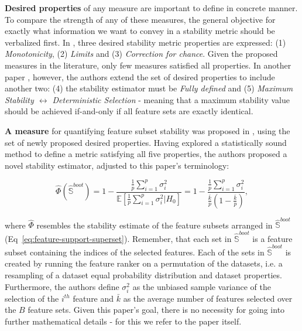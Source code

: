 \documentclass[../main.tex]{subfiles}
\begin{document}
\textbf{Desired properties} of any measure are important to define in concrete manner. To compare the strength of any of these measures, the general objective for exactly what information we want to convey in a stability metric should be verbalized first. In \citep{mohana_chelvan_survey_2016}, three desired stability metric properties are expressed: (1) \textit{Monotonicity}, (2) \textit{Limits} and (3) \textit{Correction for chance}. Given the proposed measures in the literature, only few measures satisfied all properties. In another paper \citep{nogueira_stability_2018}, however, the authors extend the set of desired properties to include another two: (4) the stability estimator must be \textit{Fully defined} and (5) \textit{Maximum Stability $\leftrightarrow$ Deterministic Selection} - meaning that a maximum stability value should be achieved if-and-only if all feature sets are exactly identical.

\textbf{A measure} for quantifying feature subset stability was proposed in \citep{nogueira_stability_2018}, using the set of newly proposed desired properties. Having explored a statistically sound method to define a metric satisfying all five properties, the authors proposed a novel stability estimator, adjusted to this paper's terminology:

\begin{equation}\label{eq:stability-measure}
\hat{\Phi}(\hat{\mathbb{S}}^{boot})=1-\frac{\frac{1}{p} \sum_{i=1}^{p} \sigma_{i}^{2}}{\mathbb{E}\left[\frac{1}{p} \sum_{i=1}^{p} \sigma_{i}^{2} | H_{0}\right]}=1-\frac{\frac{1}{p} \sum_{i=1}^{p} \sigma_{i}^{2}}{\frac{\bar{k}}{p}\left(1-\frac{\bar{k}}{p}\right)},
\end{equation}

where $\hat{\Phi}$ resembles the stability estimate of the feature subsets arranged in $\hat{\mathbb{S}}^{boot}$ (Eq~\ref{eq:feature-support-superset}). Remember, that each set in $\hat{\mathbb{S}}^{boot}$ is a feature subset containing the indices of the selected features. Each of the sets in $\hat{\mathbb{S}}^{boot}$ is created by running the feature ranker on a permutation of the datasets, i.e. a resampling of a dataset equal probability distribution and dataset properties. Furthermore, the authors define $\sigma_{i}^{2}$ as the unbiased sample variance of the selection of the $i^{t h}$ feature and $\bar{k}$ as the average number of features selected over the $B$ feature sets. Given this paper's goal, there is no necessity for going into further mathematical details - for this we refer to the paper itself.
\end{document}
